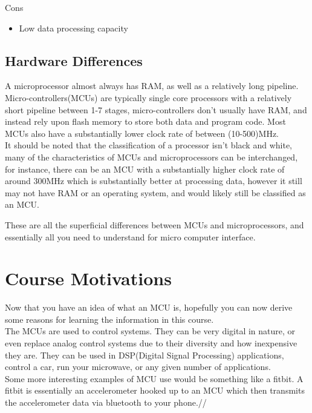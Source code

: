 \documentclass[10pt]{article}
\begin{document}
Cons
\begin{itemize}
\item Low data processing capacity
\end{itemize}

\subsection{Hardware Differences}
A microprocessor almost always has RAM, as well as a relatively long pipeline. Micro-controllers(MCUs) are typically single core processors with a relatively short pipeline between 1-7 stages, micro-controllers don't usually have RAM, and instead rely upon flash memory to store both data and program code. Most MCUs also have a substantially lower clock rate of between (10-500)MHz.\\

It should be noted that the classification of a processor isn't black and white, many of the characteristics of MCUs and microprocessors can be interchanged, for instance, there can be an MCU with a substantially higher clock rate of around 300MHz which is substantially better at processing data, however it still may not have RAM or an operating system, and would likely still be classified as an MCU.    

These are all the superficial differences between MCUs and microprocessors, and essentially all you need to understand for micro computer interface. 

\section{Course Motivations}
Now that you have an idea of what an MCU is, hopefully you can now derive some reasons for learning the information in this course.\\

The MCUs are used to control systems. They can be very digital in nature, or even replace analog control systems due to their diversity and how inexpensive they are. They can be used in DSP(Digital Signal Processing) applications, control a car, run your microwave, or any given number of applications.\\

Some more interesting examples of MCU use would be something like a fitbit. A fitbit is essentially an accelerometer hooked up to an MCU which then transmits the accelerometer data via bluetooth to your phone.//
\end{document}
